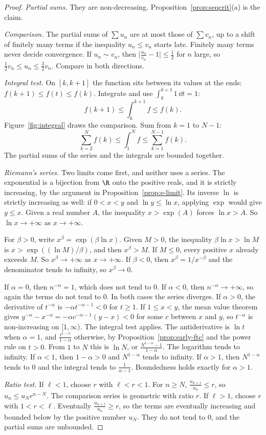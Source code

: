 \begin{proof}
\emph{Partial sums.} They are non-decreasing. Proposition~\ref{prop:seqcrit}(a) is the claim.

\emph{Comparison.} The partial sums of $\sum u_n$ are at most those of $\sum v_n$, up to a shift of finitely many terms if the inequality $u_n\le v_n$ starts late. Finitely many terms never decide convergence. If $u_n\sim v_n$, then $\bigl|\frac{u_n}{v_n}-1\bigr|\le\frac12$ for $n$ large, so $\frac12 v_n\le u_n\le\frac32 v_n$. Compare in both directions.

\emph{Integral test.} On $[k,k+1]$ the function sits between its values at the ends: $f(k+1)\le f(t)\le f(k)$. Integrate and use $\int_k^{k+1}1\,\dd t=1$:
\[
f(k+1)\le\int_k^{k+1}f\le f(k).
\]
Figure~\ref{fig:integral} draws the comparison. Sum from $k=1$ to $N-1$:
\[
\sum_{k=2}^{N}f(k)\le\int_1^N f\le\sum_{k=1}^{N-1}f(k).
\]
The partial sums of the series and the integrals are bounded together.

\emph{Riemann's series.} Two limits come first, and neither uses a series. The exponential is a bijection from $\R$ onto the positive reals, and it is strictly increasing, by the argument in Proposition~\ref{prop:e-limit}. Its inverse $\ln$ is strictly increasing as well: if $0<x<y$ and $\ln y\le\ln x$, applying $\exp$ would give $y\le x$. Given a real number $A$, the inequality $x>\exp(A)$ forces $\ln x>A$. So $\ln x\to+\infty$ as $x\to+\infty$.

For $\beta>0$, write $x^\beta=\exp(\beta\ln x)$. Given $M>0$, the inequality $\beta\ln x>\ln M$ is $x>\exp((\ln M)/\beta)$, and then $x^\beta>M$. If $M\le 0$, every positive $x$ already exceeds $M$. So $x^\beta\to+\infty$ as $x\to+\infty$. If $\beta<0$, then $x^\beta=1/x^{-\beta}$ and the denominator tends to infinity, so $x^\beta\to 0$.

If $\alpha=0$, then $n^{-\alpha}=1$, which does not tend to $0$. If $\alpha<0$, then $n^{-\alpha}\to+\infty$, so again the terms do not tend to $0$. In both cases the series diverges. If $\alpha>0$, the derivative of $t^{-\alpha}$ is $-\alpha t^{-\alpha-1}<0$ for $t\ge1$. If $1\le x<y$, the mean value theorem gives $y^{-\alpha}-x^{-\alpha}=-\alpha c^{-\alpha-1}(y-x)<0$ for some $c$ between $x$ and $y$, so $t^{-\alpha}$ is non-increasing on $[1,\infty)$. The integral test applies. The antiderivative is $\ln t$ when $\alpha=1$, and $\frac{t^{1-\alpha}}{1-\alpha}$ otherwise, by Proposition~\ref{prop:early-ftc} and the power rule on $t>0$. From $1$ to $N$ this is $\ln N$, or $\frac{N^{1-\alpha}-1}{1-\alpha}$. The logarithm tends to infinity. If $\alpha<1$, then $1-\alpha>0$ and $N^{1-\alpha}$ tends to infinity. If $\alpha>1$, then $N^{1-\alpha}$ tends to $0$ and the integral tends to $\frac1{\alpha-1}$. Boundedness holds exactly for $\alpha>1$.

\emph{Ratio test.} If $\ell<1$, choose $r$ with $\ell<r<1$. For $n\ge N$, $\frac{u_{n+1}}{u_n}\le r$, so $u_n\le u_N r^{n-N}$. The comparison series is geometric with ratio $r$. If $\ell>1$, choose $r$ with $1<r<\ell$. Eventually $\frac{u_{n+1}}{u_n}\ge r$, so the terms are eventually increasing and bounded below by the positive number $u_N$. They do not tend to $0$, and the partial sums are unbounded.
\end{proof}

